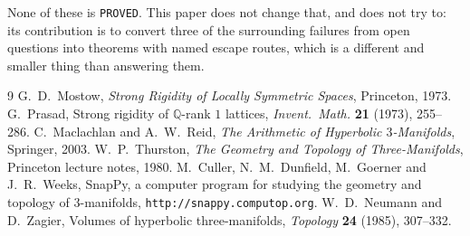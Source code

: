 \documentclass[11pt,a4paper]{article}
\theoremstyle{definition}
\theoremstyle{remark}
\newcommand{\Q}{\mathbb{Q}}
\begin{document}
\noindent
None of these is \texttt{PROVED}. This paper does not change that, and does not try to: its
contribution is to convert three of the surrounding failures from open questions into theorems
with named escape routes, which is a different and smaller thing than answering them.

\begin{thebibliography}{9}
 G.~D.~Mostow, \emph{Strong Rigidity of Locally Symmetric Spaces}, Princeton, 1973.
 G.~Prasad, Strong rigidity of $\Q$-rank $1$ lattices, \emph{Invent.\ Math.}
  \textbf{21} (1973), 255--286.
 C.~Maclachlan and A.~W.~Reid, \emph{The Arithmetic of Hyperbolic
  $3$-Manifolds}, Springer, 2003.
 W.~P.~Thurston, \emph{The Geometry and Topology of Three-Manifolds},
  Princeton lecture notes, 1980.
 M.~Culler, N.~M.~Dunfield, M.~Goerner and J.~R.~Weeks, SnapPy, a computer
  program for studying the geometry and topology of $3$-manifolds,
  \texttt{http://snappy.computop.org}.
 W.~D.~Neumann and D.~Zagier, Volumes of hyperbolic three-manifolds,
  \emph{Topology} \textbf{24} (1985), 307--332.
\end{thebibliography}
\end{document}

